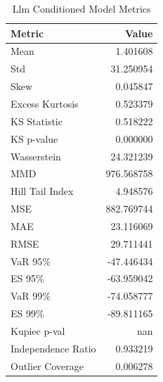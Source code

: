 \begin{table}[htbp]
\centering
\begin{tabular}{lr}
\hline
\textbf{Metric} & \textbf{Value} \\
\hline
Mean & 1.401608 \\
Std & 31.250954 \\
Skew & 0.045847 \\
Excess Kurtosis & 0.523379 \\
\hline
KS Statistic & 0.518222 \\
KS p-value & 0.000000 \\
Wasserstein & 24.321239 \\
MMD & 976.568758 \\
Hill Tail Index & 4.948576 \\
\hline
MSE & 882.769744 \\
MAE & 23.116069 \\
RMSE & 29.711441 \\
\hline
VaR 95\% & -47.446434 \\
ES 95\% & -63.959042 \\
VaR 99\% & -74.058777 \\
ES 99\% & -89.811165 \\
Kupiec p-val & nan \\
Independence Ratio & 0.933219 \\
Outlier Coverage & 0.006278 \\
\hline
\end{tabular}
\caption{Llm Conditioned Model Metrics}
\label{tab:llm_conditioned_metrics}
\end{table}
